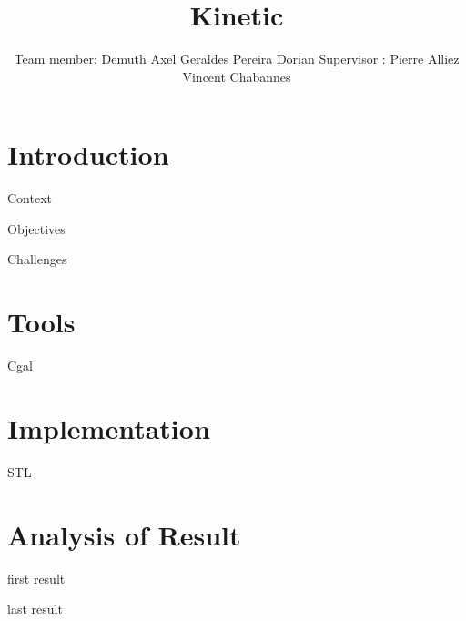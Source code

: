\documentclass[10pt]{beamer}
\title{Kinetic}
\author{Team member: \newline\newline Demuth Axel \newline Geraldes Pereira Dorian \newline\newline Supervisor :  \newline\newline Pierre Alliez \newline Vincent Chabannes}
\date{}
\begin{document}
\frame{\titlepage}
\begin{frame}
    \tableofcontents
\end{frame}
\section{Introduction}

\begin{frame}{Context}
\end{frame}
\begin{frame}[plain]{Objectives}

\end{frame}
\begin{frame}[plain]{Challenges}

\end{frame}

\section{Tools}
\begin{frame}{Cgal}

\end{frame}
\section{Implementation}
\begin{frame}{STL}

\end{frame}
\section{Analysis of Result}
\begin{frame}{first result}

\end{frame}
\begin{frame}{last result}

\end{frame}
\end{document}
